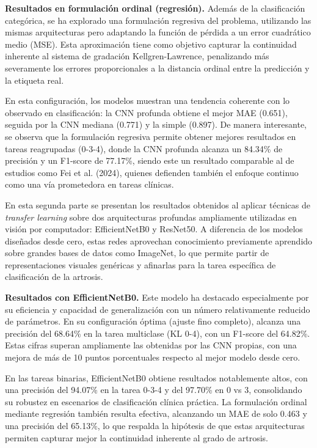 \documentclass[11pt,spanish,listoffigures,listoftables]{tfgetsinf}
\begin{document}
\textbf{Resultados en formulación ordinal (regresión).}
Además de la clasificación categórica, se ha explorado una formulación regresiva del problema, utilizando las mismas arquitecturas pero adaptando la función de pérdida a un error cuadrático medio (MSE). Esta aproximación tiene como objetivo capturar la continuidad inherente al sistema de gradación Kellgren-Lawrence, penalizando más severamente los errores proporcionales a la distancia ordinal entre la predicción y la etiqueta real.

En esta configuración, los modelos muestran una tendencia coherente con lo observado en clasificación: la CNN profunda obtiene el mejor MAE (0.651), seguida por la CNN mediana (0.771) y la simple (0.897). De manera interesante, se observa que la formulación regresiva permite obtener mejores resultados en tareas reagrupadas (0-3-4), donde la CNN profunda alcanza un 84.34\% de precisión y un F1-score de 77.17\%, siendo este un resultado comparable al de estudios como Fei et al. (2024), quienes defienden también el enfoque continuo como una vía prometedora en tareas clínicas.

En esta segunda parte se presentan los resultados obtenidos al aplicar técnicas de \textit{transfer learning} sobre dos arquitecturas profundas ampliamente utilizadas en visión por computador: EfficientNetB0 y ResNet50. A diferencia de los modelos diseñados desde cero, estas redes aprovechan conocimiento previamente aprendido sobre grandes bases de datos como ImageNet, lo que permite partir de representaciones visuales genéricas y afinarlas para la tarea específica de clasificación de la artrosis.

\textbf{Resultados con EfficientNetB0.}
Este modelo ha destacado especialmente por su eficiencia y capacidad de generalización con un número relativamente reducido de parámetros. En su configuración óptima (ajuste fino completo), alcanza una precisión del 68.64\% en la tarea multiclase (KL 0-4), con un F1-score del 64.82\%. Estas cifras superan ampliamente las obtenidas por las CNN propias, con una mejora de más de 10 puntos porcentuales respecto al mejor modelo desde cero.

En las tareas binarias, EfficientNetB0 obtiene resultados notablemente altos, con una precisión del 94.07\% en la tarea 0-3-4 y del 97.70\% en 0 vs 3, consolidando su robustez en escenarios de clasificación clínica práctica. La formulación ordinal mediante regresión también resulta efectiva, alcanzando un MAE de solo 0.463 y una precisión del 65.13\%, lo que respalda la hipótesis de que estas arquitecturas permiten capturar mejor la continuidad inherente al grado de artrosis.
\end{document}
